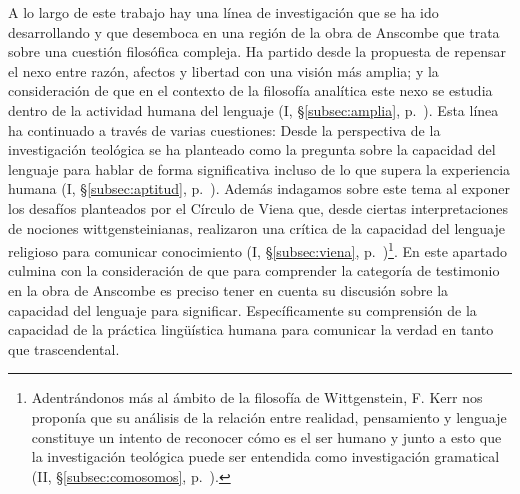 A lo largo de este trabajo hay una línea de investigación que se ha ido desarrollando y que desemboca en una región de la obra de Anscombe que trata sobre una cuestión filosófica compleja. Ha partido desde la propuesta de repensar el nexo entre razón, afectos y libertad con una visión más amplia; y la consideración de que en el contexto de la filosofía analítica este nexo se estudia dentro de la actividad humana del lenguaje (I, \S\ref{subsec:amplia}, p.~\pageref{subsec:amplia}). Esta línea ha continuado a través de varias cuestiones: Desde la perspectiva de la investigación teológica se ha planteado como la pregunta sobre la capacidad del lenguaje para hablar de forma significativa incluso de lo que supera la experiencia humana (I, \S\ref{subsec:aptitud}, p.~\pageref{subsec:aptitud}). Además indagamos sobre este tema al exponer los desafíos planteados por el Círculo de Viena que, desde ciertas interpretaciones de nociones wittgensteinianas, realizaron una crítica de la capacidad del lenguaje religioso para comunicar conocimiento (I, \S\ref{subsec:viena}, p.~\pageref{subsec:viena})\footnote{Adentrándonos más al ámbito de la filosofía de Wittgenstein, F. Kerr nos proponía que su análisis de la relación entre realidad, pensamiento y lenguaje constituye un intento de reconocer cómo es el ser humano y junto a esto que la investigación teológica puede ser entendida como investigación gramatical (II, \S\ref{subsec:comosomos}, p.~\pageref{subsec:comosomos}).}. En este apartado culmina con la consideración de que para comprender la categoría de testimonio en la obra de Anscombe es preciso tener en cuenta su discusión sobre la capacidad del lenguaje para significar. Específicamente su comprensión de la capacidad de la práctica lingüística humana para comunicar la verdad en tanto que trascendental. 

